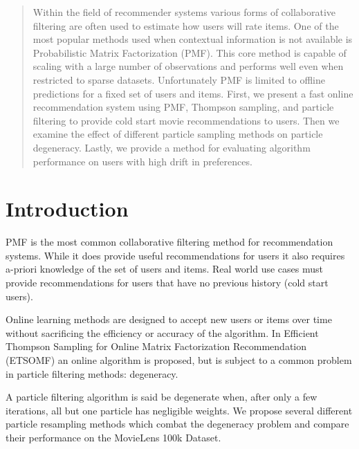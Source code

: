 \documentclass{article}
\begin{document}

\begin{abstract}
    Within the field of recommender systems various forms of collaborative filtering are often used to estimate how users will rate items. One of the most popular methods used when contextual information is not available is Probabilistic Matrix Factorization (PMF). This core method is capable of scaling with a large number of observations and performs well even when restricted to sparse datasets. Unfortunately PMF is limited to offline predictions for a fixed set of users and items. First, we present a fast online recommendation system using PMF, Thompson sampling, and particle filtering to provide cold start movie recommendations to users. Then we examine the effect of different particle sampling methods on particle degeneracy. Lastly, we provide a method for evaluating algorithm performance on users with high drift in preferences.
\end{abstract}

\section{Introduction}
PMF is the most common collaborative filtering method for recommendation systems. While it does provide useful recommendations for users it also requires a-priori knowledge of the set of users and items. Real world use cases must provide recommendations for users that have no previous history (cold start users). 

Online learning methods are designed to accept new users or items over time without sacrificing the efficiency or accuracy of the algorithm. In Efficient Thompson Sampling for Online Matrix Factorization Recommendation \cite{kawale2015efficient} (ETSOMF) an online algorithm is proposed, but is subject to a common problem in particle filtering methods: degeneracy.

A particle filtering algorithm is said be degenerate when, after only a few iterations, all but one particle has negligible weights. We propose several different particle resampling methods which combat the degeneracy problem and compare their performance on the MovieLens 100k Dataset.
\end{document}
